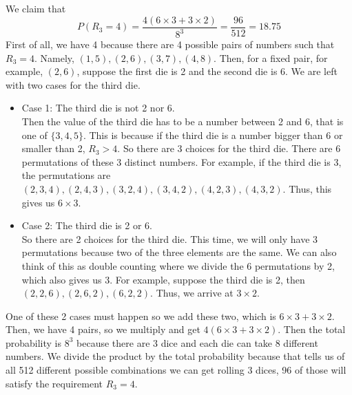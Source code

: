 \documentclass{article}
\begin{document}
We claim that $$P(R_3=4)=\frac{4(6\times 3+ 3\times 2)}{8^3}=\frac{96}{512}=18.75$$
First of all, we have 4 because there are 4 possible pairs of numbers such that $R_3=4$. Namely, $(1, 5), (2, 6), (3, 7), (4, 8)$. Then, for a fixed pair, for example, $(2, 6)$, suppose the first die is 2 and the second die is 6. We are left with two cases for the third die. 
\begin{itemize}
    \item Case 1: The third die is not 2 nor 6.\\
    Then the value of the third die has to be a number between 2 and 6, that is one of $\{3, 4, 5\}$. This is because if the third die is a number bigger than 6 or smaller than 2, $R_3 > 4$. So there are 3 choices for the third die. There are 6 permutations of these 3 distinct numbers. For example, if the third die is 3, the permutations are $(2, 3, 4), (2, 4, 3), (3, 2, 4), (3, 4, 2), (4, 2, 3), (4, 3, 2)$. Thus, this gives us $6\times 3$.
    \item Case 2: The third die is 2 or 6.\\
    So there are 2 choices for the third die. This time, we will only have 3 permutations because two of the three elements are the same. We can also think of this as double counting where we divide the 6 permutations by 2, which also gives us 3. For example, suppose the third die is 2, then $(2, 2, 6), (2, 6, 2), (6, 2, 2)$.  Thus, we arrive at $3\times 2$.
\end{itemize}
One of these 2 cases must happen so we add these two, which is $6\times 3+3\times 2$. Then, we have 4 pairs, so we multiply and get $4(6\times 3+3\times 2)$. Then the total probability is $8^3$ because there are 3 dice and each die can take 8 different numbers. We divide the product by the total probability because that tells us of all 512 different possible combinations we can get rolling 3 dices, 96 of those will satisfy the requirement $R_3=4$. 


\end{document}
